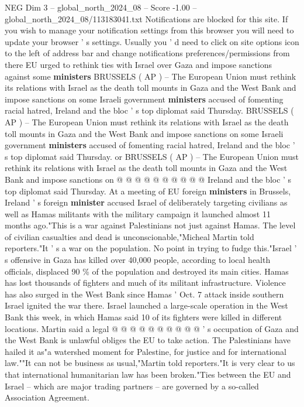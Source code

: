\begin{textsample}{NEG Dim 3 – global\_north\_2024\_08 – Score -1.00 – global\_north\_2024\_08/113183041.txt}  \label{ex:f3_neg_321}
Notifications are blocked for this site.
If you wish to manage your notification settings from this browser you will need to update your browser ' s settings.
Usually you ' d need to click on site options icon to the left of address bar and change notifications preferences/permissions from there EU urged to rethink ties with Israel over Gaza and impose sanctions against some \textbf{ministers} BRUSSELS ( AP ) -- The European Union must rethink its relations with Israel as the death toll mounts in Gaza and the West Bank and impose sanctions on some Israeli government \textbf{ministers} accused of fomenting racial hatred, Ireland and the bloc ' s top diplomat said Thursday.
BRUSSELS ( AP ) -- The European Union must rethink its relations with Israel as the death toll mounts in Gaza and the West Bank and impose sanctions on some Israeli government \textbf{ministers} accused of fomenting racial hatred, Ireland and the bloc ' s top diplomat said Thursday. or BRUSSELS ( AP ) -- The European Union must rethink its relations with Israel as the death toll mounts in Gaza and the West Bank and impose sanctions on @ @ @ @ @ @ @ @ @ @ Ireland and the bloc ' s top diplomat said Thursday.
At a meeting of EU foreign \textbf{ministers} in Brussels, Ireland ' s foreign \textbf{minister} accused Israel of deliberately targeting civilians as well as Hamas militants with the military campaign it launched almost 11 months ago."This is a war against Palestinians not just against Hamas.
The level of civilian casualties and dead is unconscionable,"Micheal Martin told reporters."It ' s a war on the population.
No point in trying to fudge this."Israel ' s offensive in Gaza has killed over 40,000 people, according to local health officials, displaced 90 \% of the population and destroyed its main cities.
Hamas has lost thousands of fighters and much of its militant infrastructure.
Violence has also surged in the West Bank since Hamas ' Oct. 7 attack inside southern Israel ignited the war there.
Israel launched a large-scale operation in the West Bank this week, in which Hamas said 10 of its fighters were killed in different locations.
Martin said a legal @ @ @ @ @ @ @ @ @ @ ' s occupation of Gaza and the West Bank is unlawful obliges the EU to take action.
The Palestinians have hailed it as"a watershed moment for Palestine, for justice and for international law.""It can not be business as usual,"Martin told reporters."It is very clear to us that international humanitarian law has been broken."Ties between the EU and Israel -- which are major trading partners -- are governed by a so-called Association Agreement.

\end{textsample}
